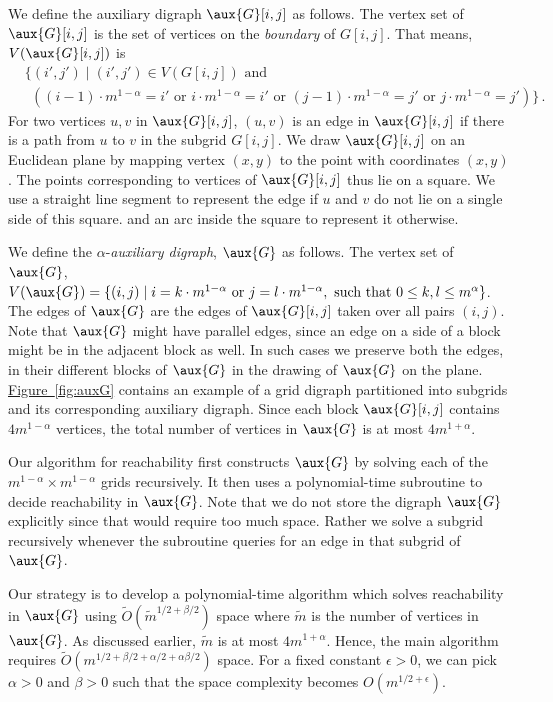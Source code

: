 \documentclass[11pt]{article}
\numberwithin{equation}{section}
\theoremstyle{definition}
\theoremstyle{plain}
\newcommand{\expref}[2]{\hyperref[#2]{#1~\ref{#2}}}
\begin{document}
%
%
%
%
We define %
the auxiliary 
digraph %
$\aux{G}[i,j]$ as follows. The vertex set of $\aux{G}[i,j]$ is the set of vertices on the \emph{boundary} of $G[i, j]$. 
%
%
That means, $V(\aux{G}[i,j])$ is
%
\begin{align*}
& \{(i',j') \mid (i',j') \in V(G[i,j]) \textrm{ and }\\
& \ \ ((i-1)\cdot m^{1-\alpha} = i' \textrm{ or } i\cdot m^{1-\alpha} = i' \textrm{ or } (j-1)\cdot m^{1-\alpha} = j' \textrm{ or } j\cdot m^{1-\alpha} = j') \}\,.
\end{align*}
For two vertices $u,v$ in $\aux{G}[i,j]$, $(u,v)$ is an edge in $\aux{G}[i,j]$ if there is a path from $u$ to $v$ in the subgrid $G[i,j]$. 
%
We draw $\aux{G}[i, j]$ on an Euclidean plane by mapping vertex $(x,y)$ to the point with %
coordinates  %
$(x, y)$. The points corresponding to vertices of $\aux{G}[i,j]$ thus lie on a square. We %
use a straight line %
segment  %
to represent the edge if $u$ and $v$ do not lie on a single side
%
%
of this square.  %
and an arc 
%
 inside the
%
square %
to represent it otherwise.  
%

%
We define the %
%
$\alpha$-\emph{auxiliary digraph}, %
$\aux{G}$ as follows. The vertex set of $\aux{G}$, $V(\aux{G}) = \{(i,j) \mid i = k\cdot m^{1-\alpha} \textrm{ or } j = l\cdot m^{1-\alpha}, \textrm{ such that } 0 \leq k,l \leq m^{\alpha} \}$. The edges of $\aux{G}$ are the edges of $\aux{G}[i,j]$ taken over all pairs $(i,j)$. Note that $\aux{G}$ might have parallel edges, since an edge on a side of a block might be %
in the adjacent block as well. In such cases we preserve both the edges,
%
%
in their different blocks of $\aux{G}$ in the drawing of $\aux{G}$ on the plane. \expref{Figure}{fig:auxG} contains an example of a grid 
digraph %
partitioned into subgrids and its corresponding auxiliary 
digraph. %
Since each block $\aux{G}[i,j]$ contains $4m^{1-\alpha}$ vertices, the total number of vertices in $\aux{G}$ %
is  %
at most $4m^{1 + \alpha}$.

Our algorithm for reachability first constructs $\aux{G}$ by solving each of the $m^{1-\alpha} \times m^{1-\alpha}$ grids recursively. It then uses a polynomial-time subroutine to decide reachability in $\aux{G}$. Note that we do not store 
the 
digraph %
$\aux{G}$ explicitly since that would require too much space. Rather we solve a subgrid recursively whenever the subroutine queries for an edge in that subgrid of $\aux{G}$.

Our strategy is to develop a polynomial-time %
algorithm which solves reachability in $\aux{G}$ using $\tilde{O}(\tilde{m}^{1/2 + \beta/2})$ space where $\tilde{m}$ is the number of vertices in $\aux{G}$. As discussed earlier, $\tilde{m}$ %
is %
 at most $4m^{1 + \alpha}$. Hence, the main algorithm requires 
$\tilde{O}(m^{1/2 + \beta/2 + \alpha/2 + \alpha\beta/2})$ space. For a fixed constant $\epsilon > 0$, we can pick $\alpha > 0$ and $\beta > 0$ such that the space complexity becomes $O(m^{1/2 + \epsilon})$.
\end{document}
